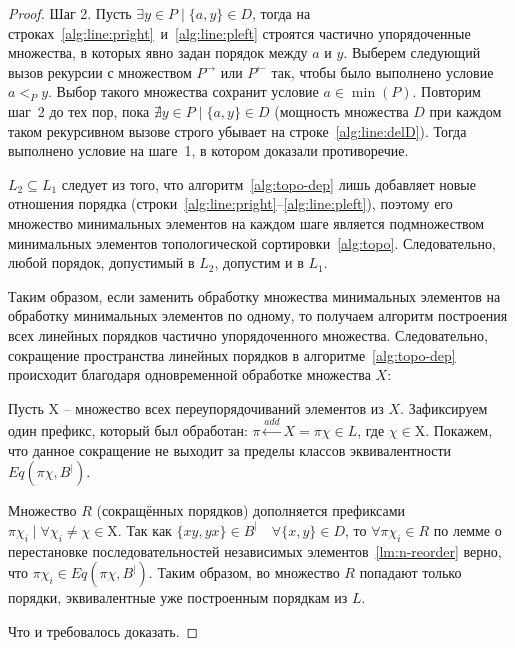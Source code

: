 \begin{proof}
  Шаг 2.
  Пусть $\exists y \in P \mid \{a, y\} \in D$, тогда на
  строках~\ref{alg:line:pright}~и~\ref{alg:line:pleft} строятся
  частично упорядоченные множества, в которых явно задан порядок
  между $a$ и $y$.
  Выберем следующий вызов рекурсии с множеством $P^{\rightarrow}$ или
  $P^{\leftarrow}$ так, чтобы было выполнено условие $a <_P y$.
  Выбор такого множества сохранит условие $a \in \min(P)$.
  Повторим шаг~2 до тех пор, пока $\nexists y \in P \mid \{a, y\}
  \in D$ (мощность множества $D$ при каждом таком рекурсивном вызове
  строго убывает на строке~\ref{alg:line:delD}).
  Тогда выполнено условие на шаге~1, в котором доказали противоречие.

  $L_2 \subseteq L_1$ следует из того, что
  алгоритм~\ref{alg:topo-dep} лишь добавляет новые отношения
  порядка (строки~\ref{alg:line:pright}--\ref{alg:line:pleft}), поэтому его
  множество минимальных элементов на каждом шаге является
  подмножеством минимальных элементов топологической
  сортировки~\ref{alg:topo}. Следовательно, любой порядок, допустимый
  в $L_2$, допустим и в $L_1$.

  Таким образом, если заменить обработку множества минимальных
  элементов на обработку минимальных элементов по одному, то получаем
  алгоритм построения всех линейных порядков частично упорядоченного множества.
  Следовательно, сокращение пространства линейных порядков
  в алгоритме~\ref{alg:topo-dep} происходит благодаря одновременной
  обработке множества $X$:
  \begin{algorithm}[H]
    \label{alg:old-cond}
    \begin{algorithmic}[1]
      \setcounter{ALG@line}{8-1}
      \State {} 
      \State {}
      \EndIf
    \end{algorithmic}
  \end{algorithm}
  Пусть $\mathrm{X}$ -- множество всех переупорядочиваний элементов из $X$.
  Зафиксируем один префикс, который был обработан: $\pi
  \stackrel{add}{\longleftarrow} X = \pi \chi \in L$, где $\chi \in \mathrm{X}$.
  Покажем, что данное сокращение не выходит за пределы классов
  эквивалентности $Eq(\pi \chi, B^|)$.

  Множество $R$ (сокращённых порядков) дополняется префиксами
  $\pi \chi_i \mid \forall \chi_i \neq \chi \in \mathrm{X}$.
  Так как $\{xy, yx\} \in B^| \quad \forall \{x,y\} \in D$, то $\forall
  \pi \chi_i \in R$ по лемме о перестановке последовательностей
  независимых элементов~\ref{lm:n-reorder} верно, что $\pi \chi_i
  \in Eq(\pi \chi, B^|)$. Таким образом, во множество $R$ попадают
  только порядки, эквивалентные уже построенным порядкам из $L$.

  Что и требовалось доказать.

\end{proof}

